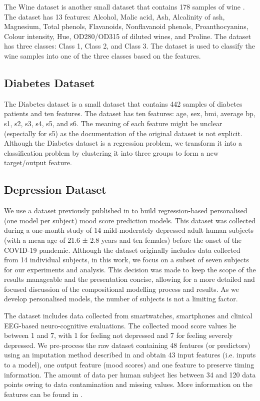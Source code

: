 The Wine dataset is another small dataset that contains 178 samples of wine \cite{misc_wine_109}. The dataset has 13 features: Alcohol, Malic acid, Ash, Alcalinity of ash, Magnesium, Total phenols, Flavanoids, Nonflavanoid phenols, Proanthocyanins, Colour intensity, Hue, OD280/OD315 of diluted wines, and Proline. The dataset has three classes: Class 1, Class 2, and Class 3. The dataset is used to classify the wine samples into one of the three classes based on the features.

\subsection{Diabetes Dataset}
\label{sec:sub_sub_diabetes}

The Diabetes dataset is a small dataset that contains 442 samples of diabetes patients \cite{efron_2004} and ten features. The dataset has ten features: age, sex, \gls{bmi}, average \gls{bp}, s1, s2, s3, s4, s5, and s6. The meaning of each feature might be unclear (especially for s5) as the documentation of the original dataset is not explicit. Although the Diabetes dataset is a regression problem, we transform it into a classification problem by clustering it into three groups to form a new target/output feature.



\subsection{Depression Dataset}
We use a dataset previously published in \cite{shah_personalized_2021} to build regression-based personalised (one model per subject) mood score prediction models. This dataset was collected during a one-month study of 14 mild-moderately depressed adult human subjects (with a mean age of 21.6 ± 2.8 years and ten females) before the onset of the COVID-19 pandemic. Although the dataset originally includes data collected from 14 individual subjects, in this work, we focus on a subset of seven subjects for our experiments and analysis. This decision was made to keep the scope of the results manageable and the presentation concise, allowing for a more detailed and focused discussion of the compositional modelling process and results. As we develop personalised models, the number of subjects is not a limiting factor.

The dataset includes data collected from smartwatches, smartphones and clinical EEG-based neuro-cognitive evaluations. The collected mood score values lie between 1 and 7, with 1 for feeling not depressed and 7 for feeling severely depressed. We pre-process the raw dataset containing 48 features (or predictors) using an imputation method described in \cite{chatterjee_2024} and obtain 43 input features (i.e. inputs to a model), one output feature (mood scores) and one feature to preserve timing information. The amount of data per human subject lies between 34 and 120 data points owing to data contamination and missing values. More information on the features can be found in \cite{chatterjee_2024}.

